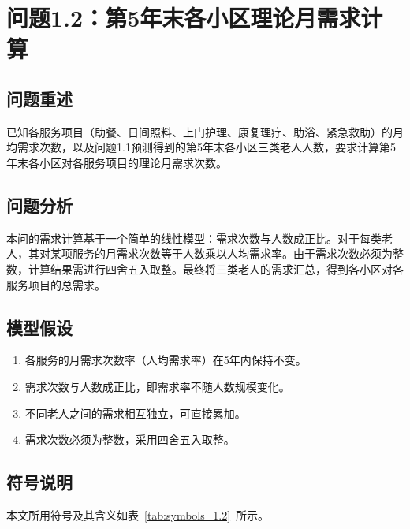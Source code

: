 \documentclass[12pt,a4paper]{article}
\begin{document}
\section{问题1.2：第5年末各小区理论月需求计算}

\subsection{问题重述}

已知各服务项目（助餐、日间照料、上门护理、康复理疗、助浴、紧急救助）的月均需求次数，以及问题1.1预测得到的第5年末各小区三类老人人数，要求计算第5年末各小区对各服务项目的理论月需求次数。

\subsection{问题分析}

本问的需求计算基于一个简单的线性模型：需求次数与人数成正比。对于每类老人，其对某项服务的月需求次数等于人数乘以人均需求率。由于需求次数必须为整数，计算结果需进行四舍五入取整。最终将三类老人的需求汇总，得到各小区对各服务项目的总需求。

\subsection{模型假设}

\begin{enumerate}
    \item 各服务的月需求次数率（人均需求率）在5年内保持不变。
    \item 需求次数与人数成正比，即需求率不随人数规模变化。
    \item 不同老人之间的需求相互独立，可直接累加。
    \item 需求次数必须为整数，采用四舍五入取整。
\end{enumerate}

\subsection{符号说明}

本文所用符号及其含义如表~\ref{tab:symbols_1.2}~所示。
\end{document}
